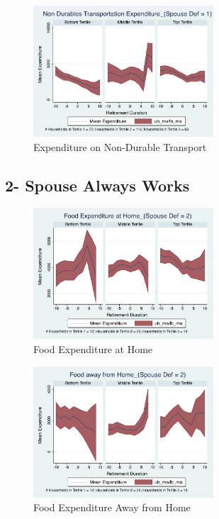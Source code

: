 \documentclass[11pt]{article}
\begin{document}
\begin{figure}[h]
	\caption{Expenditure on Non-Durable Transport}
	\centering
	\includegraphics[width=0.6\textwidth]{../ConsumptionPostRetirement_by_SpouseDef_Cats/Smoothed/1/spouse_def_total_transport_real.pdf}
\end{figure}
\clearpage

\subsection{2- Spouse Always Works}

\begin{figure}[h]
	\caption{Food Expenditure at Home}
	\centering
	\includegraphics[width=0.6\textwidth]{../ConsumptionPostRetirement_by_SpouseDef_Cats/Smoothed/2/spouse_def_total_foodexp_home_real.pdf}
\end{figure}


\begin{figure}[h]
	\caption{Food Expenditure Away from Home}
	\centering
	\includegraphics[width=0.6\textwidth]{../ConsumptionPostRetirement_by_SpouseDef_Cats/Smoothed/2/spouse_def_total_foodexp_away_real.pdf}
\end{figure}
\end{document}

